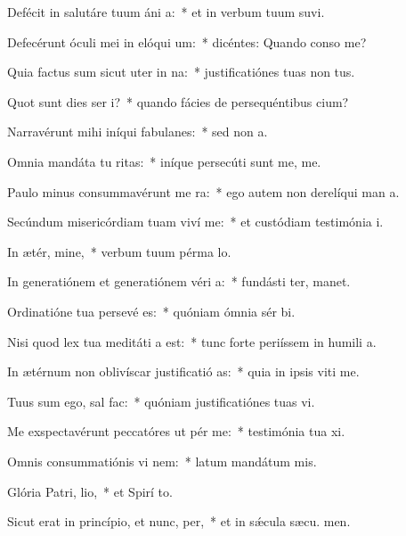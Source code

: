 \item Defécit in salutáre tuum áni a:~* et in verbum tuum suvi.
\item Defecérunt óculi mei in elóqui um:~* dicéntes: Quando conso me?
\item Quia factus sum sicut uter in na:~* justificatiónes tuas non  tus.
\item Quot sunt dies ser i?~* quando fácies de persequéntibus  cium?
\item Narravérunt mihi iníqui fabulanes:~* sed non   a.
\item Omnia mandáta tu ritas:~* iníque persecúti sunt me,  me.
\item Paulo minus consummavérunt me  ra:~* ego autem non derelíqui man a.
\item Secúndum misericórdiam tuam viví me:~* et custódiam testimónia  i.
\item In ætér, mine,~* verbum tuum pérma  lo.
\item In generatiónem et generatiónem véri a:~* fundásti ter,  manet.
\item Ordinatióne tua persevé es:~* quóniam ómnia sér bi.
\item Nisi quod lex tua meditáti a est:~* tunc forte periíssem in humili a.
\item In ætérnum non oblivíscar justificatió as:~* quia in ipsis viti me.
\item Tuus sum ego, sal  fac:~* quóniam justificatiónes tuas vi.
\item Me exspectavérunt peccatóres ut pér me:~* testimónia tua xi.
\item Omnis consummatiónis vi nem:~* latum mandátum  mis.
\item Glória Patri,  lio,~* et Spirí to.
\item Sicut erat in princípio, et nunc,  per,~* et in sǽcula sæcu. men.
